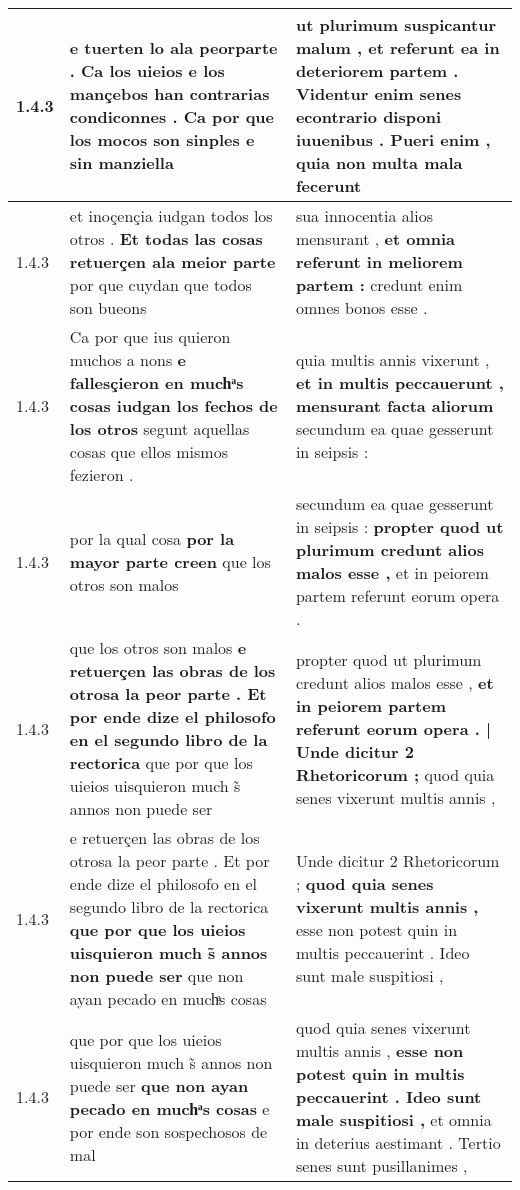 \begin{tabular}{|p{1cm}|p{6.5cm}|p{6.5cm}|}
1.4.3 & e tuerten lo ala peorparte . \textbf{ Ca los uieios e los mançebos han contrarias condiconnes . } Ca por que los mocos son sinples e sin manziella & ut plurimum suspicantur malum , \textbf{ et referunt ea in deteriorem partem . Videntur enim senes econtrario disponi iuuenibus . Pueri enim , } quia non multa mala fecerunt \\\hline
1.4.3 & et inoçençia iudgan todos los otros . \textbf{ Et todas las cosas retuerçen ala meior parte } por que cuydan que todos son bueons & sua innocentia alios mensurant , \textbf{ et omnia referunt in meliorem partem : } credunt enim omnes bonos esse . \\\hline
1.4.3 & Ca por que ius quieron muchos a nons \textbf{ e fallesçieron en muchͣs cosas iudgan los fechos de los otros } segunt aquellas cosas que ellos mismos fezieron . & quia multis annis vixerunt , \textbf{ et in multis peccauerunt , mensurant facta aliorum } secundum ea quae gesserunt in seipsis : \\\hline
1.4.3 & por la qual cosa \textbf{ por la mayor parte creen } que los otros son malos & secundum ea quae gesserunt in seipsis : \textbf{ propter quod ut plurimum credunt alios malos esse , } et in peiorem partem referunt eorum opera . \\\hline
1.4.3 & que los otros son malos \textbf{ e retuerçen las obras de los otrosa la peor parte . Et por ende dize el philosofo en el segundo libro de la rectorica } que por que los uieios uisquieron much s̃ annos non puede ser & propter quod ut plurimum credunt alios malos esse , \textbf{ et in peiorem partem referunt eorum opera . | Unde dicitur 2 Rhetoricorum ; } quod quia senes vixerunt multis annis , \\\hline
1.4.3 & e retuerçen las obras de los otrosa la peor parte . Et por ende dize el philosofo en el segundo libro de la rectorica \textbf{ que por que los uieios uisquieron much s̃ annos non puede ser } que non ayan pecado en muchͣs cosas & Unde dicitur 2 Rhetoricorum ; \textbf{ quod quia senes vixerunt multis annis , } esse non potest quin in multis peccauerint . Ideo sunt male suspitiosi , \\\hline
1.4.3 & que por que los uieios uisquieron much s̃ annos non puede ser \textbf{ que non ayan pecado en muchͣs cosas } e por ende son sospechosos de mal & quod quia senes vixerunt multis annis , \textbf{ esse non potest quin in multis peccauerint . Ideo sunt male suspitiosi , } et omnia in deterius aestimant . Tertio senes sunt pusillanimes , \\\hline

\end{tabular}
